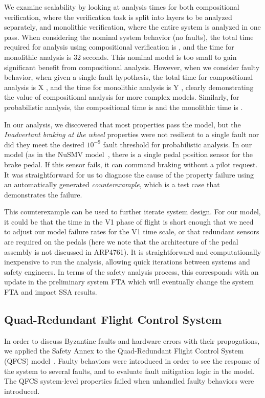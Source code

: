We examine scalability by looking at analysis times for both compositional verification, where the verification task is split into layers to be analyzed separately, and monolithic verification, where the entire system is analyzed in one pass.  When considering the nominal system behavior (no faults), the total time required for analysis using compositional verification is , and the time for monolithic analysis is 32 seconds.  This nominal model is too small to gain significant benefit from compositional analysis.  However, when we consider faulty behavior, when given a single-fault hypothesis, the total time for compositional analysis is X , and the time for monolithic analysis is Y , clearly demonstrating the value of compositional analysis for more complex models.  Similarly, for probabilistic analysis, the compositional time is  and the monolithic time is .

In our analysis, we discovered that most properties pass the model, but the \textit{Inadvertant braking at the wheel} properties were not resilient to a single fault nor did they meet the desired $10^{-9}$ fault threshold for probabilistic analysis.  In our model (as in the NuSMV model~\cite{DBLP:conf/cav/BozzanoCPJKPRT15}, there is a single pedal position sensor for the brake pedal.  If this sensor fails, it can command braking without a pilot request.  It was straightforward for us to diagnose the cause of the property failure using an automatically generated {\em counterexample}, which is a test case that demonstrates the failure.  

This counterexample can be used to further iterate system design.  For our model, it could be that the time in the V1 phase of flight is short enough that we need to adjust our model failure rates for the V1 time scale, or that redundant sensors are required on the pedals (here we note that the architecture of the pedal assembly is not discussed in ARP4761).  It is straightforward and computationally inexpensive to run the analysis, allowing quick iterations between systems and safety engineers.
In terms of the safety analysis process, this corresponds with an update in the preliminary system FTA which will eventually change the system FTA and impact SSA results.

\subsection{Quad-Redundant Flight Control System}
In order to discuss Byzantine faults and hardware errors with their propogations, we applied the Safety Annex to the Quad-Redundant Flight Control System (QFCS) model~\cite{QFCS15:backes}. Faulty behaviors were introduced in order to see the response of the system to several faults, and to evaluate fault mitigation logic in the model.  The QFCS system-level properties failed when unhandled faulty behaviors were introduced.


